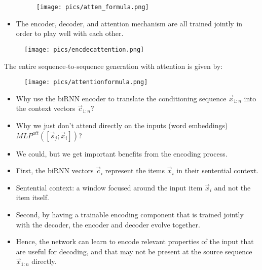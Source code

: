 \begin{itemize}
\begin{figure}[h]
        	\texttt{[image: pics/atten\_formula.png]}
        \end{figure}  

        
               

\item The encoder, decoder, and attention mechanism are all trained jointly in order to play well with each other.


\end{itemize}





         \begin{figure}[h]
        	\texttt{[image: pics/encdecattention.png]}
        \end{figure}  



The entire sequence-to-sequence generation with attention is given by:

\begin{figure}[h]
        	\texttt{[image: pics/attentionformula.png]}
        \end{figure}  

        
                
\begin{itemize}
\item Why use the biRNN encoder to translate the conditioning sequence $\vec{x}_{1:n}$  into the context vectors $\vec{c}_{1:n}$?
\item Why we just don't attend directly on the inputs (word embeddings) $MLP^{att}([\vec{s}_j;\vec{x}_i])$?
\item We could, but we get important benefits from the encoding process.
\item First, the biRNN vectors $\vec{c}_i$ represent the items $\vec{x}_i$ in their sentential context.
\item Sentential context: a window focused around the input item $\vec{x}_i$ and not the item itself.
\item Second, by having a trainable encoding component that is trained jointly with the decoder, the encoder and decoder evolve together.
\item Hence, the network can learn to encode relevant properties of the input that are useful for decoding, and that may not be present at the source sequence $\vec{x}_{1:n}$ directly.
\end{itemize}



